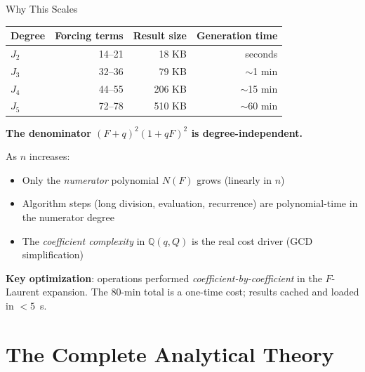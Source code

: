\documentclass[aspectratio=169, 11pt]{beamer}
\begin{document}
\begin{frame}{Why This Scales}

\begin{center}
\begin{tabular}{@{}lrrr@{}}
\toprule
Degree & Forcing terms & Result size & Generation time \\
\midrule
$J_2$ & 14--21 & 18 KB & seconds \\
$J_3$ & 32--36 & 79 KB & $\sim$1 min \\
$J_4$ & 44--55 & 206 KB & $\sim$15 min \\
$J_5$ & 72--78 & 510 KB & $\sim$60 min \\
\bottomrule
\end{tabular}
\end{center}

\vspace{0.2em}
\textbf{The denominator $(F+q)^2(1+qF)^2$ is degree-independent.}

\vspace{0.1em}
As $n$ increases:
\begin{itemize}\setlength{\itemsep}{0.1em}
    \item Only the \emph{numerator} polynomial $N(F)$ grows (linearly in $n$)
    \item Algorithm steps (long division, evaluation, recurrence)
          are polynomial-time in the numerator degree
    \item The \emph{coefficient complexity} in $\mathbb{Q}(q, Q)$ is the
          real cost driver (GCD simplification)
\end{itemize}

\vspace{0.1em}
\textbf{Key optimization}: operations performed
\emph{coefficient-by-coefficient} in the $F$-Laurent expansion.
The 80-min total is a \alert{one-time} cost; results cached and
loaded in $< 5$~s.

\end{frame}

\section{The Complete Analytical Theory}
\end{document}
